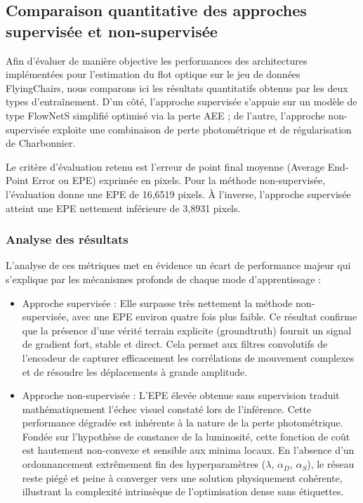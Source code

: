 \documentclass{magnolia}
\begin{document}
\subsection{Comparaison quantitative des approches supervisée et non-supervisée}

Afin d'évaluer de manière objective les performances des architectures implémentées pour l'estimation du flot optique sur le jeu de données FlyingChairs, nous comparons ici les résultats quantitatifs obtenus par les deux types d'entraînement. D'un côté, l'approche supervisée s'appuie sur un modèle de type FlowNetS simplifié optimisé via la perte AEE ; de l'autre, l'approche non-supervisée exploite une combinaison de perte photométrique et de régularisation de Charbonnier. 

Le critère d'évaluation retenu est l'erreur de point final moyenne (Average End-Point Error ou EPE) exprimée en pixels. Pour la méthode non-supervisée, l'évaluation donne une EPE de 16,6519 pixels. À l'inverse, l'approche supervisée atteint une EPE nettement inférieure de 3,8931 pixels.

\subsubsection{Analyse des résultats}

L'analyse de ces métriques met en évidence un écart de performance majeur qui s'explique par les mécanismes profonds de chaque mode d'apprentissage :

\begin{itemize}
    \item Approche supervisée : Elle surpasse très nettement la méthode non-supervisée, avec une EPE environ quatre fois plus faible. Ce résultat confirme que la présence d'une vérité terrain explicite (groundtruth) fournit un signal de gradient fort, stable et direct. Cela permet aux filtres convolutifs de l'encodeur de capturer efficacement les corrélations de mouvement complexes et de résoudre les déplacements à grande amplitude.
    
    \item Approche non-supervisée : L'EPE élevée obtenue sans supervision traduit mathématiquement l'échec visuel constaté lors de l'inférence. Cette performance dégradée est inhérente à la nature de la perte photométrique. Fondée sur l'hypothèse de constance de la luminosité, cette fonction de coût est hautement non-convexe et sensible aux minima locaux. En l'absence d'un ordonnancement extrêmement fin des hyperparamètres ($\lambda$, $\alpha_D$, $\alpha_S$), le réseau reste piégé et peine à converger vers une solution physiquement cohérente, illustrant la complexité intrinsèque de l'optimisation dense sans étiquettes.
\end{itemize}
\end{document}
